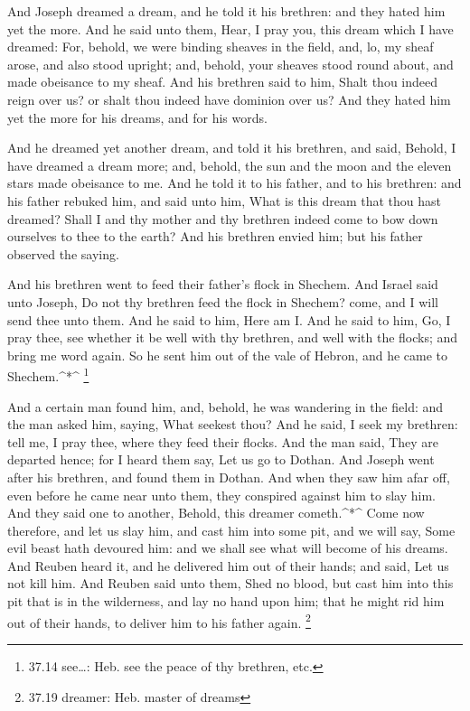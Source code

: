  And Joseph dreamed a dream, and he told it his brethren:
and they hated him yet the more.  And he said unto them,
Hear, I pray you, this dream which I have dreamed:  For,
behold, we were binding sheaves in the field, and, lo, my sheaf arose,
and also stood upright; and, behold, your sheaves stood round about, and
made obeisance to my sheaf.  And his brethren said to him,
Shalt thou indeed reign over us? or shalt thou indeed have dominion over
us? And they hated him yet the more for his dreams, and for his words.

 And he dreamed yet another dream, and told it his brethren,
and said, Behold, I have dreamed a dream more; and, behold, the sun and
the moon and the eleven stars made obeisance to me.  And he
told it to his father, and to his brethren: and his father rebuked him,
and said unto him, What is this dream that thou hast dreamed? Shall I
and thy mother and thy brethren indeed come to bow down ourselves to
thee to the earth?  And his brethren envied him; but his
father observed the saying.

 And his brethren went to feed their father's flock in
Shechem.  And Israel said unto Joseph, Do not thy brethren
feed the flock in Shechem? come, and I will send thee unto them. And he
said to him, Here am I.  And he said to him, Go, I pray
thee, see whether it be well with thy brethren, and well with the
flocks; and bring me word again. So he sent him out of the vale of
Hebron, and he came to Shechem.\^{}*\^{} \footnote{37.14 see\ldots: Heb.
  see the peace of thy brethren, etc.}

 And a certain man found him, and, behold, he was wandering
in the field: and the man asked him, saying, What seekest thou?
 And he said, I seek my brethren: tell me, I pray thee,
where they feed their flocks.  And the man said, They are
departed hence; for I heard them say, Let us go to Dothan. And Joseph
went after his brethren, and found them in Dothan.  And
when they saw him afar off, even before he came near unto them, they
conspired against him to slay him.  And they said one to
another, Behold, this dreamer cometh.\^{}*\^{}  Come now
therefore, and let us slay him, and cast him into some pit, and we will
say, Some evil beast hath devoured him: and we shall see what will
become of his dreams.  And Reuben heard it, and he
delivered him out of their hands; and said, Let us not kill him.
 And Reuben said unto them, Shed no blood, but cast him
into this pit that is in the wilderness, and lay no hand upon him; that
he might rid him out of their hands, to deliver him to his father again.
\footnote{37.19 dreamer: Heb. master of dreams}

